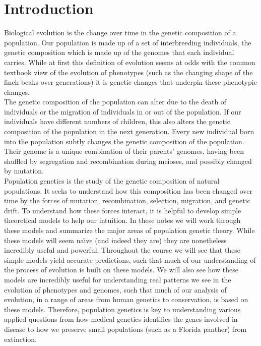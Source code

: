 \chapter{Introduction}
 Biological evolution is the change over time in the genetic composition of a population.\cite{DobzhanskyBook} Our population is made up of a set of interbreeding individuals, the genetic composition which is made up of the  genomes that each individual carries.  While at first this definition of evolution seems at odds with the
common textbook view of the evolution of phenotypes (such as the changing shape
of the finch beaks over generations) it is genetic changes that underpin these
phenotypic changes.  \\

The genetic composition of the population can alter due to the death of individuals or the migration of individuals in or out
of the population. If our individuals have different numbers of children, this
also alters the genetic composition of the population in the next generation.
Every new individual born into the population subtly changes the genetic
composition of the population. Their genome is a unique combination of their
parents' genomes, having been shuffled by segregation and recombination during
meioses, and possibly changed by mutation. \\

Population genetics is the study of the genetic composition of natural
populations. It seeks to understand how this composition has been changed over
time by the forces of mutation, recombination, selection, migration, and
genetic drift.  To understand how these forces interact, it is helpful to
develop simple theoretical models to help our intuition. In these notes we will
work through these models and summarize the major areas of population genetic
theory. While these models will seem na\"{\i}ve (and indeed they are) they are
nonetheless incredibly useful and powerful. Throughout the course we will see
that these simple models yield accurate predictions, such that much of our
understanding of the process of evolution is built on these models. We will
also see how these models are incredibly useful for understanding real patterns
we see in the evolution of phenotypes and genomes, such that much of our
analysis of evolution, in a range of areas from human genetics to conservation,
is based on these models. Therefore, population genetics is key to
understanding various applied questions from how medical genetics identifies
the genes involved in disease to how we preserve small populations (such as a
Florida panther) from extinction. 

